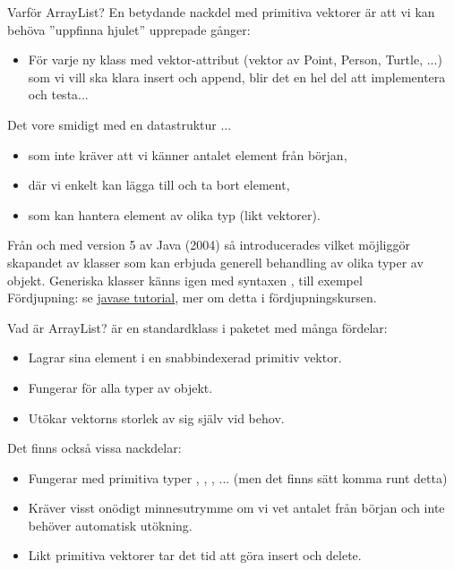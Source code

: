 \begin{Slide}{Varför ArrayList?}\footnotesize
En betydande nackdel med primitiva vektorer är att vi kan behöva ''uppfinna hjulet'' upprepade gånger:
\begin{itemize}
\item För varje ny klass med vektor-attribut (vektor av Point, Person, Turtle, ...) som vi vill ska klara insert och append, blir det en hel del att implementera och testa... 
\end{itemize}
Det vore smidigt med en datastruktur ...
\begin{itemize}
\item som inte kräver att vi känner antalet element från början,
\item där vi enkelt kan lägga till och ta bort element,
\item som kan hantera element av olika typ (likt vektorer).
\end{itemize}
Från och med version 5 av Java (2004) så introducerades  vilket möjliggör skapandet av klasser som kan erbjuda generell behandling av olika typer av objekt. Generiska klasser känns igen med syntaxen , till exempel    \\ {\footnotesize Fördjupning: se   \href{https://docs.oracle.com/javase/tutorial/extra/generics/intro.html}{javase tutorial}, mer om detta i fördjupningskursen.}
\end{Slide}

\begin{Slide}{Vad är ArrayList?}
 är en standardklass i paketet  med många fördelar:
\begin{itemize}
\item Lagrar sina element i en snabbindexerad primitiv vektor.
\item Fungerar för alla typer av objekt.
\item Utökar vektorns storlek av sig själv vid behov.
\end{itemize}
Det finns också vissa nackdelar:
\begin{itemize}
\item Fungerar  med primitiva typer , , , ... (men det finns sätt komma runt detta)
\item Kräver visst onödigt minnesutrymme om vi vet antalet från  början och inte behöver automatisk utökning. 
\item Likt primitiva vektorer tar det tid att göra insert och delete.
\end{itemize}
\end{Slide}

